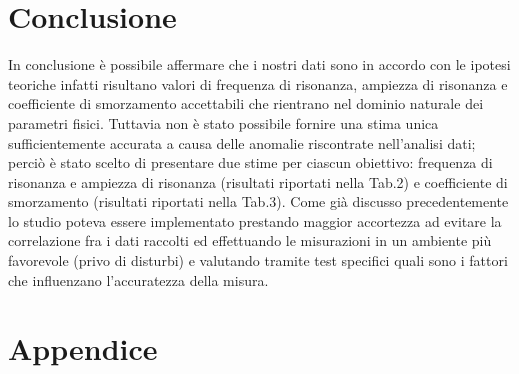 \documentclass{article}
\begin{document}
\section{Conclusione}
In conclusione è possibile affermare che i nostri dati sono in accordo con le ipotesi teoriche infatti risultano valori di frequenza di risonanza, ampiezza di risonanza e coefficiente di smorzamento  accettabili che rientrano nel dominio naturale dei parametri fisici. Tuttavia non è stato possibile fornire una stima unica sufficientemente accurata a causa delle anomalie riscontrate nell'analisi dati; perciò è stato scelto di presentare due stime per ciascun obiettivo: frequenza di risonanza e ampiezza di risonanza (risultati riportati nella Tab.2) e coefficiente di smorzamento (risultati riportati nella Tab.3). Come già discusso precedentemente lo studio poteva essere implementato prestando maggior accortezza ad evitare la correlazione fra i dati raccolti ed effettuando le misurazioni in un ambiente più favorevole (privo di disturbi) e valutando tramite test specifici quali sono i fattori che influenzano l'accuratezza della misura. 

\newpage
\section{Appendice}
\end{document}

